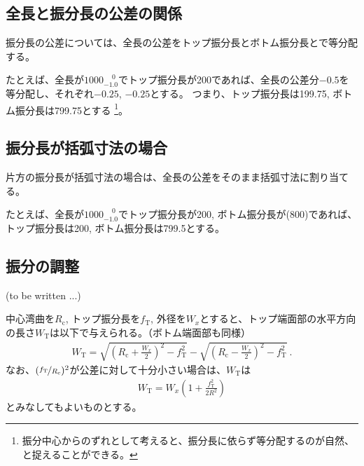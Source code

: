\subsection{全長と振分長の公差の関係}
振分長の公差については、全長の公差をトップ振分長とボトム振分長とで等分配する。

たとえば、全長が$1000^{\phantom +0}_{-1.0}$でトップ振分長が200であれば、全長の公差分$-0.5$を等分配し、それぞれ$-0.25$, $-0.25$とする。
つまり、トップ振分長は199.75, ボトム振分長は799.75とする
\footnote{振分中心からのずれとして考えると、振分長に依らず等分配するのが自然、と捉えることができる。}。


\subsection{振分長が括弧寸法の場合}
片方の振分長が括弧寸法の場合は、全長の公差をそのまま括弧寸法に割り当てる。

たとえば、全長が$1000^{\phantom +0}_{-1.0}$でトップ振分長が200, ボトム振分長が(800)であれば、トップ振分長は200, ボトム振分長は799.5とする。


\subsection{振分の調整\TBW}
(to be written ...)


\clearpage
中心湾曲を$R_\mathrm c$, トップ振分長を$f_\mathrm T$, 外径を$W_x$とすると、トップ端面部の水平方向の長さ$W_\mathrm T$は以下で与えられる。（ボトム端面部も同様）
\begin{align*}
  W_\mathrm T
  = \sqrt{\left(R_\mathrm c+\frac{W_x}2\right)^{\!2}-f_\mathrm T^2}
    -\sqrt{\left(R_\mathrm c-\frac{W_x}2\right)^{\!2}-f_\mathrm T^2}\ .
\end{align*}
なお、$(\nicefrac{f_\mathrm T}{R_\mathrm c})^2$が公差に対して十分小さい場合は、$W_\mathrm T$は
\begin{align*}
  W_\mathrm T
  = W_x\!\left(1+\frac{f_\mathrm T^2}{2R^2}\right)
\end{align*}
とみなしてもよいものとする。


